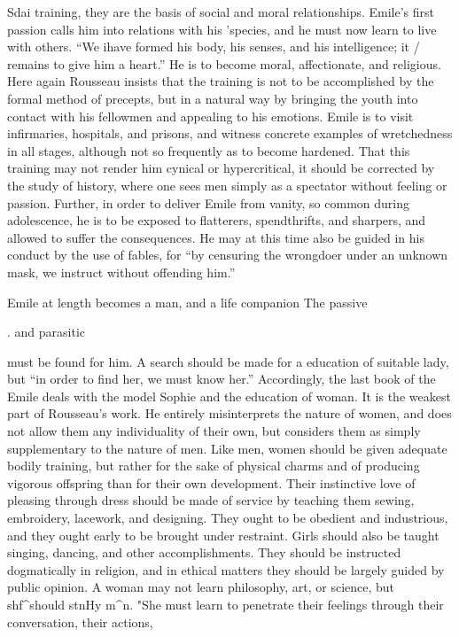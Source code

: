 \documentclass[]{book}
\begin{document}
Sdai training, they are the basis of social and moral relationships. Emile's first passion calls him into relations with his 'species, and he must now learn to live with others. ``We ihave formed his body, his senses, and his intelligence; it / remains to give him a heart.'' He is to become moral, affectionate, and religious. Here again Rousseau insists that the training is not to be accomplished by the formal method of precepts, but in a natural way by bringing the youth into contact with his fellowmen and appealing to his emotions. Emile is to visit infirmaries, hospitals, and prisons, and witness concrete examples of wretchedness in all stages, although not so frequently as to become hardened. That this training may not render him cynical\protect\hypertarget{ch19.xmlux5cux23para.274.1.0.box.156.222.1047.475.q.60}{}{ or hypercritical, it should be corrected by the study of history, where one sees men simply as a spectator without feeling or passion. Further, in order to deliver Emile from vanity, so common during adolescence, he is to be exposed to flatterers, spendthrifts, and sharpers, and allowed to suffer the consequences. He may at this time also be guided in his conduct by the use of fables, for ``by censuring the wrongdoer under an unknown mask, we instruct without offending him.''}

Emile at length becomes a man, and a life companion The passive

. and parasitic

must be found for him. A search should be made for a education of suitable lady, but ``in order to find her, we must know her.'' Accordingly, the last book of the Emile deals with the model Sophie and the education of woman. It is the weakest part of Rousseau's work. He entirely misinterprets the nature of women, and does not allow them any individuality of their own, but considers them as simply supplementary to the nature of men. Like men, women should be given adequate bodily training, but rather for the sake of physical charms and of producing vigorous offspring than for their own development. Their instinctive love of pleasing through dress should be made of service by teaching them sewing, embroidery, lacework, and designing. They ought to be obedient and industrious, and they ought early to be brought under restraint. Girls should also be taught singing, dancing, and other accomplishments. They should be instructed dogmatically in religion, and in ethical matters they should be largely guided by public opinion. A woman may not learn philosophy, art, or science, but shf\^{}should stnHy m\^{}n. "She must learn to penetrate their feelings through their conversation, their actions,
\end{document}
